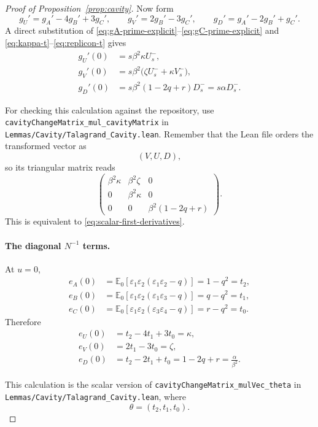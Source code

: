 \begin{proof}[Proof of Proposition~\ref{prop:cavity}]
Now form
\[
 g_U'=g_A'-4g_B'+3g_C',
 \qquad
 g_V'=2g_B'-3g_C',
 \qquad
 g_D'=g_A'-2g_B'+g_C'.
\]
A direct substitution of
\eqref{eq:gA-prime-explicit}--\eqref{eq:gC-prime-explicit}
and
\eqref{eq:kappa-t}--\eqref{eq:replicon-t}
gives
\begin{align}
 g_U'(0)
 &=
 s\beta^2\kappa U_s^-,
 \nonumber\\
 g_V'(0)
 &=
 s\beta^2
 \bigl(
 \zeta U_s^-+\kappa V_s^-
 \bigr),
 \label{eq:scalar-first-derivatives}\\
 g_D'(0)
 &=
 s\beta^2(1-2q+r)D_s^-
 =
 s\alpha D_s^-.
 \nonumber
\end{align}

For checking this calculation against the repository, use
\texttt{cavityChangeMatrix\_mul\_cavityMatrix} in
\texttt{Lemmas/Cavity/Talagrand\_Cavity.lean}.
Remember that the Lean file orders the transformed vector as
\[
 (V,U,D),
\]
so its triangular matrix reads
\[
 \begin{pmatrix}
 \beta^2\kappa&\beta^2\zeta&0\\
 0&\beta^2\kappa&0\\
 0&0&\beta^2(1-2q+r)
 \end{pmatrix}.
\]
This is equivalent to \eqref{eq:scalar-first-derivatives}.

\paragraph{The diagonal $N^{-1}$ terms.}

At $u=0$,
\begin{align*}
 e_A(0)
 &=
 \mathbb E_0[
 \varepsilon_1\varepsilon_2
 (\varepsilon_1\varepsilon_2-q)
 ]
 =
 1-q^2
 =
 t_2,
 \\
 e_B(0)
 &=
 \mathbb E_0[
 \varepsilon_1\varepsilon_2
 (\varepsilon_1\varepsilon_3-q)
 ]
 =
 q-q^2
 =
 t_1,
 \\
 e_C(0)
 &=
 \mathbb E_0[
 \varepsilon_1\varepsilon_2
 (\varepsilon_3\varepsilon_4-q)
 ]
 =
 r-q^2
 =
 t_0.
\end{align*}
Therefore
\begin{align}
 e_U(0)
 &=
 t_2-4t_1+3t_0
 =
 \kappa,
 \nonumber\\
 e_V(0)
 &=
 2t_1-3t_0
 =
 \zeta,
 \label{eq:scalar-diagonal-terms}\\
 e_D(0)
 &=
 t_2-2t_1+t_0
 =
 1-2q+r
 =
 \frac{\alpha}{\beta^2}.
 \nonumber
\end{align}

This calculation is the scalar version of
\texttt{cavityChangeMatrix\_mulVec\_theta} in
\texttt{Lemmas/Cavity/Talagrand\_Cavity.lean}, where
\[
 \theta=(t_2,t_1,t_0).
\]


\end{proof}
